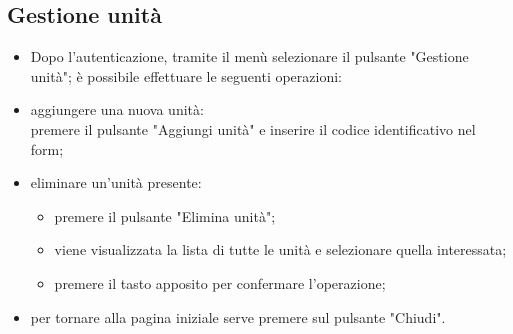 \subsection{Gestione unità}
\begin{itemize}
\item Dopo l'autenticazione, tramite il menù selezionare il pulsante "Gestione unità"; è possibile effettuare le seguenti operazioni:
    \item aggiungere una nuova unità: \\premere il pulsante "Aggiungi unità" e inserire il codice identificativo nel form;
    \item eliminare un'unità presente: 
    \begin{itemize}
        \item premere il pulsante "Elimina unità";
        \item viene visualizzata la lista di tutte le unità e selezionare quella interessata;
        \item premere il tasto apposito per confermare l'operazione;
    \end{itemize}
    \item per tornare alla pagina iniziale serve premere sul pulsante "Chiudi".
\end{itemize}